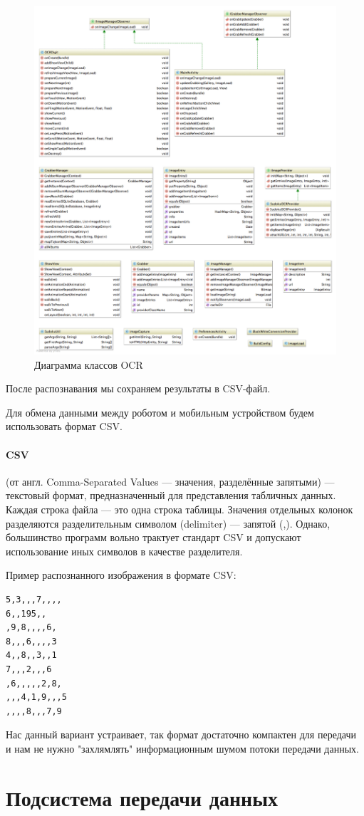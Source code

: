 \begin{figure}[ht]
  \centering
  \includegraphics[width=\textwidth]{inc/raster/design2-15.png}
  \caption{Диаграмма классов OCR}
  \label{fig:fig2100}
\end{figure}

После распознавания мы сохраняем результаты в CSV-файл.

Для обмена данными между роботом и мобильным устройством будем использовать формат CSV.

\paragraph{CSV} (от англ. Comma-Separated Values — значения, разделённые запятыми) — текстовый формат, предназначенный для представления табличных данных. Каждая строка файла — это одна строка таблицы. Значения отдельных колонок разделяются разделительным символом (delimiter) — запятой (,). Однако, большинство программ вольно трактует стандарт CSV и допускают использование иных символов в качестве разделителя. 

Пример распознанного изображения в формате CSV:
\begin{lstlisting}[caption=CSV файл с задание]
5,3,,,7,,,,
6,,195,,
,9,8,,,,6,
8,,,6,,,,3
4,,8,,3,,1
7,,,2,,,6
,6,,,,,2,8,
,,,4,1,9,,,5
,,,,8,,,7,9
\end{lstlisting}

Нас данный вариант устраивает, так формат достаточно компактен для передачи и нам не нужно "захлямлять" информационным шумом потоки передачи данных. 

\section{Подсистема передачи данных}






